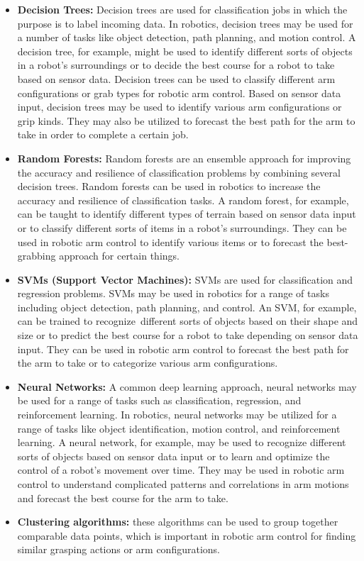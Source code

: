 \documentclass[12pt,oneside]{article}
\begin{document}
\begin{itemize}
\item \textbf{Decision Trees:} Decision trees are used for classification jobs in which the purpose is to label incoming data.  In robotics, decision trees may be used for a number of tasks like object detection, path planning, and motion control. A decision tree, for example, might be used to identify different sorts of objects in a robot's surroundings or to decide the best course for a robot to take based on sensor data. Decision trees can be used to classify different arm configurations or grab types for robotic arm control.
Based on sensor data input, decision trees may be used to identify various arm configurations or grip kinds. They may also be utilized to forecast the best path for the arm to take in order to complete a certain job.

\item \textbf{Random Forests:} Random forests are an ensemble approach for improving the accuracy and resilience of classification problems by combining several decision trees. Random forests can be used in robotics to increase the accuracy and resilience of classification tasks. A random forest, for example, can be taught to identify different types of terrain based on sensor data input or to classify different sorts of items in a robot's surroundings. They can be used in robotic arm control to identify various items or to forecast the best-grabbing approach for certain things.

\item \textbf{SVMs (Support Vector Machines):} SVMs are used for classification and regression problems. SVMs may be used in robotics for a range of tasks including object detection, path planning, and control. An SVM, for example, can be trained to recognize different sorts of objects based on their shape and size or to predict the best course for a robot to take depending on sensor data input. They can be used in robotic arm control to forecast the best path for the arm to take or to categorize various arm configurations.

\item \textbf{Neural Networks:} A common deep learning approach, neural networks may be used for a range of tasks such as classification, regression, and reinforcement learning. In robotics, neural networks may be utilized for a range of tasks like object identification, motion control, and reinforcement learning. A neural network, for example, may be used to recognize different sorts of objects based on sensor data input or to learn and optimize the control of a robot's movement over time. They may be used in robotic arm control to understand complicated patterns and correlations in arm motions and forecast the best course for the arm to take.

\item \textbf{Clustering algorithms:} these algorithms can be used to group together comparable data points, which is important in robotic arm control for finding similar grasping actions or arm configurations.

\end{itemize}
\end{document}
